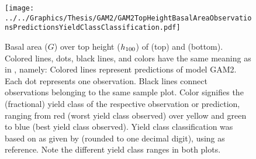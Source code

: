 \begin{figure}[h]
  \centering
  \texttt{[image: ../../Graphics/Thesis/GAM2/GAM2TopHeightBasalAreaObservationsPredictionsYieldClassClassification.pdf]}
  \caption{Basal area (\(G\)) over top height (\(h_{100}{}\)) of \Beech{} (top) and \Spruce{} (bottom).  Colored lines, dots, black lines, and colors have the same meaning as in , namely:  Colored lines represent predictions of model GAM2.  Each dot represents one observation.  Black lines connect observations belonging to the same sample plot.  Color signifies the (fractional) yield class of the respective observation or prediction, ranging from red (worst yield class observed) over yellow and green to blue (best yield class observed).  Yield class classification was based on \ProductivityIndexText{} as given by  (rounded to one decimal digit), using  as reference.  Note the different yield class ranges in both plots.}
  \label{fig:GAM2TopHeightBasalAreaObservationsPredictionsYieldClassClassification}
\end{figure}

\clearpage{}

